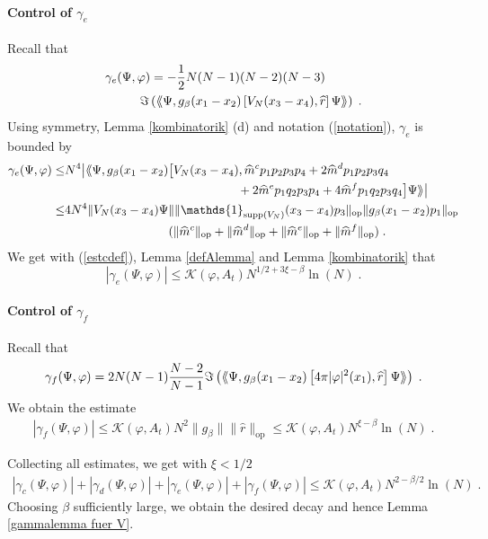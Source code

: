 \documentclass[11pt, english, american]{article}
\newcommand{\laa}{\langle\hspace{-0.08cm}\langle}
\newcommand{\raa}{\rangle\hspace{-0.08cm}\rangle}
\renewcommand{\phi}{\varphi}
\newcommand{\ds}{\gamma_e}
\begin{document}

\paragraph{Control of $\ds$}
Recall that \begin{align*}&\ds (\Psi,\phi)=-\frac{1}{2}N(N-1)(N-2)(N-3)\\&\;\;\;\;\;\;\;\;\;\;\Im\left(\laa\Psi ,
g_{\beta}(x_{1}-x_{2})\left[V_N(x_3-x_4),
\widehat{r}\right] \Psi\raa\right)
\;.
\end{align*}
Using symmetry, Lemma \ref{kombinatorik} (d) and notation (\ref{notation}),
 $\ds$ is bounded by
\begin{align*}\ds (\Psi,\phi)\leq&N^4\big|\laa\Psi ,
g_{\beta}(x_{1}-x_{2})\big[V_N(x_3-x_4),
\widehat{m}^cp_1p_2p_3p_4+2\widehat{m}^dp_1p_2p_3q_4\\&\hspace{5cm}+
2\widehat{m}^ep_1q_2p_3p_4+4\widehat{m}^fp_1q_2p_3q_4\big] \Psi\raa\big|
%
\\\leq&4N^4\|V_N(x_3-x_4)\Psi\|\|\mathds{1}_{\text{supp}(V_N)}(x_3-x_4)p_3\|_{\text{op}}\|g_{\beta}(x_{1}-x_{2})p_1\|_{\text{op}}
\\&\hspace{3cm}(\|\widehat{m}^c\|_{\text{op}}+\|\widehat{m}^d\|_{\text{op}}+\|\widehat{m}^e\|_{\text{op}}+\|\widehat{m}^f\|_{\text{op}})
\;.
\end{align*}
We get with (\ref{estcdef}), Lemma \ref{defAlemma} and Lemma \ref{kombinatorik} that
$$ |\ds (\Psi,\phi)|\leq  \mathcal{K}(\phi,A_t) N^{1/2+3\xi- \beta} \ln(N)\;.$$




\paragraph{Control of $\gamma_f$}
Recall that 
\begin{align*}
\gamma_f(\Psi,\phi)
=
2
N(N-1)\frac{N-2}{N-1}\Im\left(\laa\Psi,g_{\beta}(x_{1}-x_{2})
\left[4 \pi |\phi|^2(x_1),
\widehat{r}\right] \Psi\raa\right)
\;.
\end{align*}
We obtain the estimate
\begin{align*}
|\gamma_f(\Psi,\phi)|
\leq
\mathcal{K}(\phi,A_t)
N^2
\|g_\beta\|
\| \widehat{r} \|_{\text{op}}
\leq
\mathcal{K}(\phi,A_t)
N^{\xi-\beta} \ln(N)
\;.
\end{align*}


Collecting all estimates, we get with $\xi <1/2$
\begin{align*}
|\gamma_c (\Psi,\phi)|+|\gamma_d (\Psi,\phi)|+|\gamma_e (\Psi,\phi)|+|\gamma_f(\Psi,\phi)|
\leq
\mathcal{K}(\phi,A_t)
N^{2-\beta/2} \ln(N)
\;.
\end{align*}
 Choosing $\beta$ sufficiently large, we obtain the desired decay and hence Lemma \ref{gammalemma fuer V}.
\end{document}
